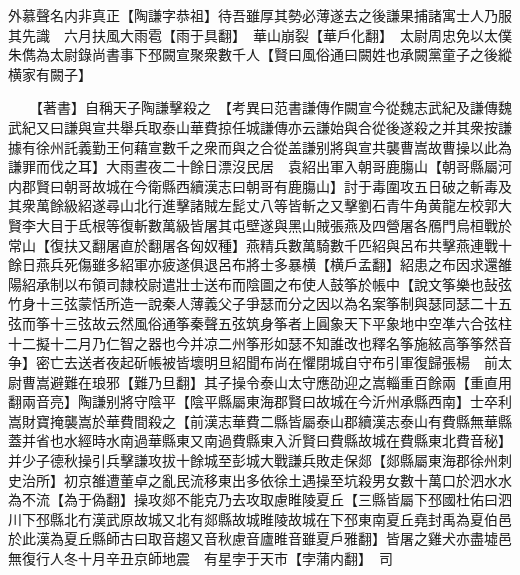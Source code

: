 外慕聲名内非真正【陶謙字恭祖】待吾雖厚其勢必薄遂去之後謙果捕諸寓士人乃服其先識　六月扶風大雨雹【雨于具翻】　華山崩裂【華戶化翻】　太尉周忠免以太僕朱儁為太尉錄尚書事下邳闕宣聚衆數千人【賢曰風俗通曰闕姓也承闕黨童子之後縱横家有闕子】

　　【著書】自稱天子陶謙擊殺之　【考異曰范書謙傳作闕宣今從魏志武紀及謙傳魏武紀又曰謙與宣共舉兵取泰山華費掠任城謙傳亦云謙始與合從後遂殺之并其衆按謙據有徐州託義勤王何藉宣數千之衆而與之合從盖謙别將與宣共襲曹嵩故曹操以此為謙罪而伐之耳】大雨晝夜二十餘日漂沒民居　袁紹出軍入朝哥鹿膓山【朝哥縣屬河内郡賢曰朝哥故城在今衛縣西續漢志曰朝哥有鹿膓山】討于毒圍攻五日破之斬毒及其衆萬餘級紹遂尋山北行進擊諸賊左髭丈八等皆斬之又擊劉石青牛角黄龍左校郭大賢李大目于氐根等復斬數萬級皆屠其屯壁遂與黑山賊張燕及四營屠各鴈門烏桓戰於常山【復扶又翻屠直於翻屠各匈奴種】燕精兵數萬騎數千匹紹與呂布共擊燕連戰十餘日燕兵死傷雖多紹軍亦疲遂俱退呂布將士多暴横【横戶孟翻】紹患之布因求還雒陽紹承制以布領司隸校尉遣壯士送布而陰圖之布使人鼓筝於帳中【說文筝樂也鼔弦竹身十三弦蒙恬所造一說秦人薄義父子爭瑟而分之因以為名案筝制與瑟同瑟二十五弦而筝十三弦故云然風俗通筝秦聲五弦筑身筝者上圓象天下平象地中空凖六合弦柱十二擬十二月乃仁智之器也今并凉二州筝形如瑟不知誰改也釋名筝施絃高筝筝然音争】密亡去送者夜起斫帳被皆壞明旦紹聞布尚在懼閉城自守布引軍復歸張楊　前太尉曹嵩避難在琅邪【難乃旦翻】其子操令泰山太守應劭迎之嵩輜重百餘兩【重直用翻兩音亮】陶謙别將守陰平【陰平縣屬東海郡賢曰故城在今沂州承縣西南】士卒利嵩財寶掩襲嵩於華費間殺之【前漢志華費二縣皆屬泰山郡續漢志泰山有費縣無華縣蓋并省也水經時水南過華縣東又南過費縣東入沂賢曰費縣故城在費縣東北費音秘】并少子德秋操引兵擊謙攻拔十餘城至彭城大戰謙兵敗走保郯【郯縣屬東海郡徐州刺史治所】初京雒遭董卓之亂民流移東出多依徐土遇操至坑殺男女數十萬口於泗水水為不流【為于偽翻】操攻郯不能克乃去攻取慮睢陵夏丘【三縣皆屬下邳國杜佑曰泗川下邳縣北冇漢武原故城又北有郯縣故城睢陵故城在下邳東南夏丘堯封禹為夏伯邑於此漢為夏丘縣師古曰取音趨又音秋慮音廬睢音雖夏戶雅翻】皆屠之雞犬亦盡墟邑無復行人冬十月辛丑京師地震　有星孛于天市【孛蒲内翻】　司

